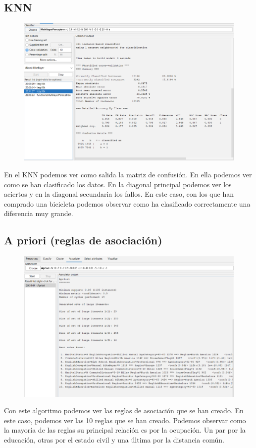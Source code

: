 \documentclass[12pt]{article}
\begin{document}
\subsection{KNN}

\begin{figure}[h!]
    \centering
    \includegraphics[width=.6\textwidth]{KNN.PNG}
    \label{fig:my_label}
\end{figure}

En el KNN podemos ver como salida la matriz de confusión. En ella podemos ver como se han clasificado los datos. En la diagonal principal
podemos ver los aciertos y en la diagonal secundaria los fallos. En este caso, con los que han comprado una bicicleta podemos observar
como ha clasificado correctamente una diferencia muy grande.

\subsection{A priori (reglas de asociación)}

\begin{figure}[h!]
    \centering
    \includegraphics[width=.6\textwidth]{apriori.PNG}
    \label{fig:my_label}
\end{figure}

Con este algoritmo podemos ver las reglas de asociación que se han creado. En este caso, podemos ver las 10 reglas que se han creado.
Podemos observar como la mayoría de las reglas su principal relación es por la ocupación. Un par por la educación, otras por el estado civil
y una última por la distancia común.
\end{document}
